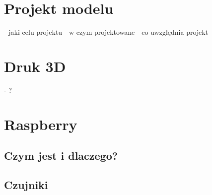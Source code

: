 \section{Projekt modelu}
- jaki celu projektu
- w czym projektowane
- co uwzględnia projekt

\section{Druk 3D}
- ?

\section{Raspberry}

\subsection{Czym jest i dlaczego?}

\subsection{Czujniki}
